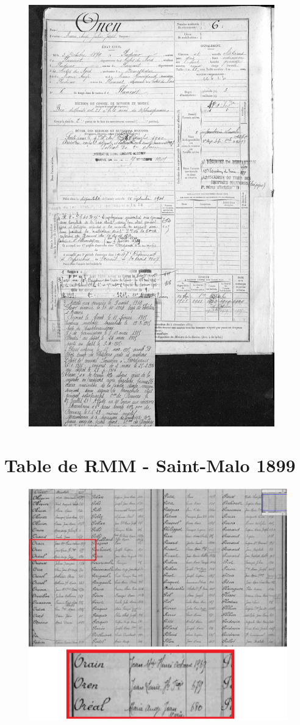 \documentclass[a4paper]{article}
\begin{document}
\begin{figure}[H]
\centering
\includegraphics[width=0.95\textwidth]{RMM.JPG}
\end{figure}

\section{Table de RMM - Saint-Malo 1899}
\label{sec:annexe 2}

\begin{figure}[H]
\centering
\includegraphics[width=\textwidth]{Table_Onen.png}
\end{figure}
\end{document}
